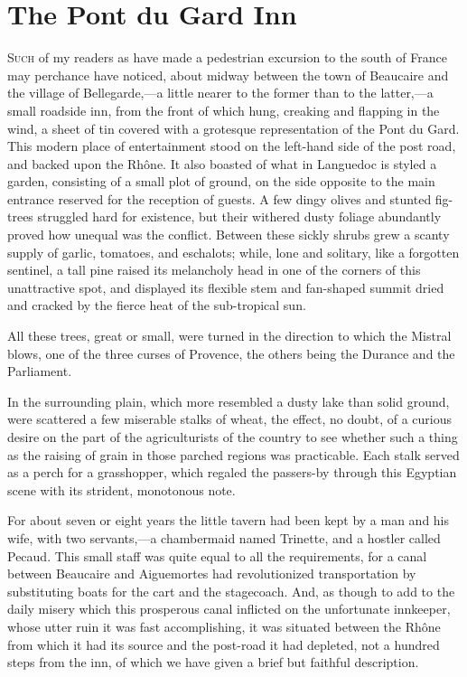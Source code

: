 \chapter{The Pont du Gard Inn} 

 \lettrine{S}{uch} of my readers as have made a pedestrian excursion to the south of France may perchance have noticed, about midway between the town of Beaucaire and the village of Bellegarde,—a little nearer to the former than to the latter,—a small roadside inn, from the front of which hung, creaking and flapping in the wind, a sheet of tin covered with a grotesque representation of the Pont du Gard. This modern place of entertainment stood on the left-hand side of the post road, and backed upon the Rhône. It also boasted of what in Languedoc is styled a garden, consisting of a small plot of ground, on the side opposite to the main entrance reserved for the reception of guests. A few dingy olives and stunted fig-trees struggled hard for existence, but their withered dusty foliage abundantly proved how unequal was the conflict. Between these sickly shrubs grew a scanty supply of garlic, tomatoes, and eschalots; while, lone and solitary, like a forgotten sentinel, a tall pine raised its melancholy head in one of the corners of this unattractive spot, and displayed its flexible stem and fan-shaped summit dried and cracked by the fierce heat of the sub-tropical sun. 

 All these trees, great or small, were turned in the direction to which the Mistral blows, one of the three curses of Provence, the others being the Durance and the Parliament. 

 In the surrounding plain, which more resembled a dusty lake than solid ground, were scattered a few miserable stalks of wheat, the effect, no doubt, of a curious desire on the part of the agriculturists of the country to see whether such a thing as the raising of grain in those parched regions was practicable. Each stalk served as a perch for a grasshopper, which regaled the passers-by through this Egyptian scene with its strident, monotonous note. 

 For about seven or eight years the little tavern had been kept by a man and his wife, with two servants,—a chambermaid named Trinette, and a hostler called Pecaud. This small staff was quite equal to all the requirements, for a canal between Beaucaire and Aiguemortes had revolutionized transportation by substituting boats for the cart and the stagecoach. And, as though to add to the daily misery which this prosperous canal inflicted on the unfortunate innkeeper, whose utter ruin it was fast accomplishing, it was situated between the Rhône from which it had its source and the post-road it had depleted, not a hundred steps from the inn, of which we have given a brief but faithful description. 

